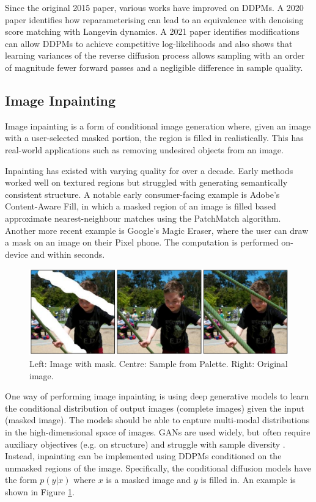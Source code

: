 \documentclass{article}
\begin{document}
Since the original 2015 paper, various works have improved on DDPMs. A 2020 paper \cite{Ho-2020} identifies how reparameterising can lead to an equivalence with denoising score matching with Langevin dynamics. A 2021 paper \cite{Nichol-2021} identifies modifications can allow DDPMs to achieve competitive log-likelihoods and also shows that learning variances of the reverse diffusion process allows sampling with an order of magnitude fewer forward passes and a negligible difference in sample quality.

\subsection{Image Inpainting}

Image inpainting is a form of conditional image generation where, given an image with a user-selected masked portion, the region is filled in realistically. This has real-world applications such as removing undesired objects from an image.

Inpainting has existed with varying quality for over a decade. Early methods worked well on textured regions but struggled with generating semantically consistent structure. \cite{Saharia-2022} A notable early consumer-facing example is Adobe's Content-Aware Fill, in which a masked region of an image is filled based approximate nearest-neighbour matches using the PatchMatch algorithm. Another more recent example is Google's Magic Eraser, where the user can draw a mask on an image on their Pixel phone. The computation is performed on-device and within seconds.

\begin{figure}[h]
\centering
\includegraphics[width=1\textwidth]{Inpainting.png}
\caption{Left: Image with mask. Centre: Sample from Palette. Right: Original image. \cite{Saharia-2022}}
\label{fig:Inpainting}
\end{figure}

One way of performing image inpainting is using deep generative models to learn the conditional distribution of output images (complete images) given the input (masked image). The models should be able to capture multi-modal distributions in the high-dimensional space of images. GANs are used widely, but often require auxiliary objectives (e.g. on structure) and struggle with sample diversity \cite{Saharia-2022}. Instead, inpainting can be implemented using DDPMs conditioned on the unmasked regions of the image. Specifically, the conditional diffusion models have the form $p(y|x)$ where $x$ is a masked image and $y$ is filled in. An example is shown in Figure \ref{fig:Inpainting}.
\end{document}
